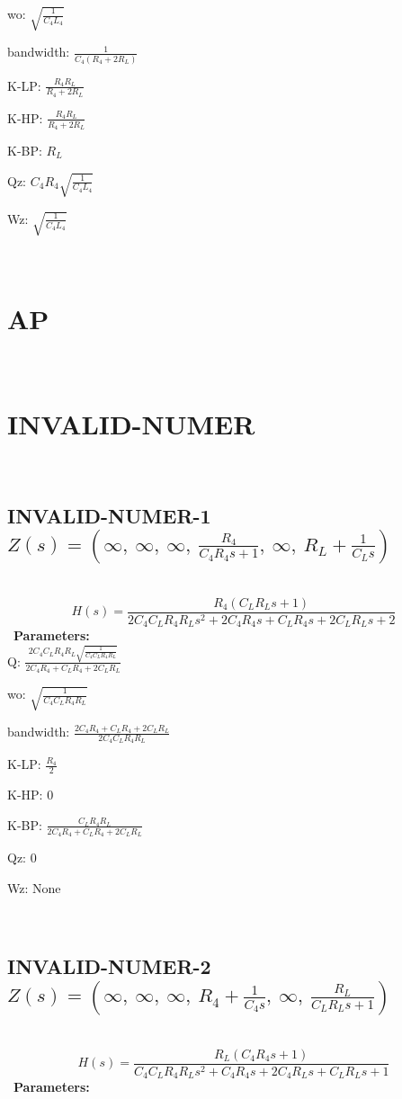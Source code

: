\documentclass{article}
\begin{document}
wo: $\sqrt{\frac{1}{C_{4} L_{4}}}$\ 

bandwidth: $\frac{1}{C_{4} \left(R_{4} + 2 R_{L}\right)}$\ 

K-LP: $\frac{R_{4} R_{L}}{R_{4} + 2 R_{L}}$\ 

K-HP: $\frac{R_{4} R_{L}}{R_{4} + 2 R_{L}}$\ 

K-BP: $R_{L}$\ 

Qz: $C_{4} R_{4} \sqrt{\frac{1}{C_{4} L_{4}}}$\ 

Wz: $\sqrt{\frac{1}{C_{4} L_{4}}}$\ 

\ 

\section{AP}\ 
\section{INVALID-NUMER}\ 
\subsection{INVALID-NUMER-1 $Z(s) = \left( \infty, \  \infty, \  \infty, \  \frac{R_{4}}{C_{4} R_{4} s + 1}, \  \infty, \  R_{L} + \frac{1}{C_{L} s}\right)$ } \ 
\textbf{\[H(s) = \frac{R_{4} \left(C_{L} R_{L} s + 1\right)}{2 C_{4} C_{L} R_{4} R_{L} s^{2} + 2 C_{4} R_{4} s + C_{L} R_{4} s + 2 C_{L} R_{L} s + 2}\] } \ 
\textbf{Parameters:}\\ 

Q: $\frac{2 C_{4} C_{L} R_{4} R_{L} \sqrt{\frac{1}{C_{4} C_{L} R_{4} R_{L}}}}{2 C_{4} R_{4} + C_{L} R_{4} + 2 C_{L} R_{L}}$\ 

wo: $\sqrt{\frac{1}{C_{4} C_{L} R_{4} R_{L}}}$\ 

bandwidth: $\frac{2 C_{4} R_{4} + C_{L} R_{4} + 2 C_{L} R_{L}}{2 C_{4} C_{L} R_{4} R_{L}}$\ 

K-LP: $\frac{R_{4}}{2}$\ 

K-HP: $0$\ 

K-BP: $\frac{C_{L} R_{4} R_{L}}{2 C_{4} R_{4} + C_{L} R_{4} + 2 C_{L} R_{L}}$\ 

Qz: $0$\ 

Wz: $\text{None}$\ 

\ 

\subsection{INVALID-NUMER-2 $Z(s) = \left( \infty, \  \infty, \  \infty, \  R_{4} + \frac{1}{C_{4} s}, \  \infty, \  \frac{R_{L}}{C_{L} R_{L} s + 1}\right)$ } \ 
\textbf{\[H(s) = \frac{R_{L} \left(C_{4} R_{4} s + 1\right)}{C_{4} C_{L} R_{4} R_{L} s^{2} + C_{4} R_{4} s + 2 C_{4} R_{L} s + C_{L} R_{L} s + 1}\] } \ 
\textbf{Parameters:}\\ 
\end{document}
